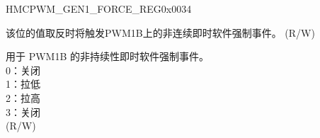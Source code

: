 \addtocounter{Regfloat}{-1}
\begin{register}{H}{MCPWM\_GEN1\_FORCE\_REG}{0x0034}
\begin{regdesc}\begin{reglist}
\item [...接上页]
\label{fielddesc:MCPWMGEN1BNCIFORCE}\item [MCPWM\_GEN1\_B\_NCIFORCE] 该位的值取反时将触发PWM1B上的非连续即时软件强制事件。 (R/W)
\label{fielddesc:MCPWMGEN1BNCIFORCEMODE}\item [MCPWM\_GEN1\_B\_NCIFORCE\_MODE] 用于 PWM1B 的非持续性即时软件强制事件。\\
0：关闭\\
1：拉低\\
2：拉高\\
3：关闭\\
(R/W)
\end{reglist}\end{regdesc}
\end{register}


